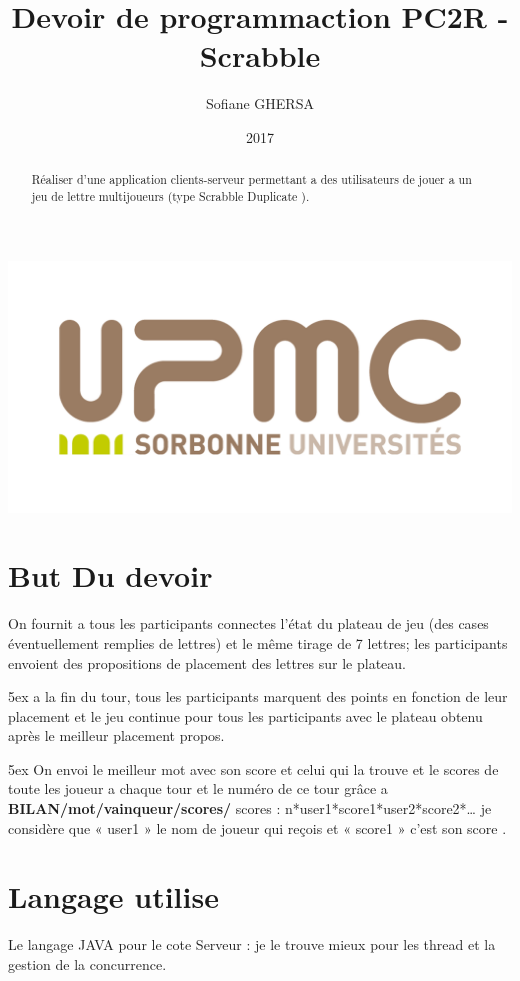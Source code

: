 \documentclass[french]{article}
\title{Devoir de programmaction PC2R - Scrabble}
\author{Sofiane GHERSA}
\date{2017}
\begin{document}
\maketitle
\includegraphics{images/logo_upmc.png}
 
\tableofcontents

\vspace{2cm} %
 
\begin{abstract}
    Réaliser d'une application clients-serveur permettant
a des utilisateurs de jouer a un jeu de lettre multijoueurs (type Scrabble Duplicate ).
\end{abstract}
 
\section{ But Du devoir}
    On fournit a tous les participants connectes l’état du plateau de jeu (des cases
éventuellement remplies de lettres) et le même tirage de 7 lettres; les participants envoient
des propositions de placement des lettres sur le plateau.

\noindent
\setlength { \parindent } {5ex }
    a la fin du tour, tous les participants marquent des points en fonction de leur
placement et le jeu continue pour tous les participants avec le plateau obtenu après le
meilleur placement propos.
 
\noindent
\setlength { \parindent } {5ex }
    On envoi le meilleur mot avec son score et celui qui la trouve et le scores de toute les
joueur a chaque tour et le numéro de ce tour grâce a \textbf{BILAN/mot/vainqueur/scores/}   
\noindent scores : n*user1*score1*user2*score2*…
\noindent je considère que « user1 » le nom de joueur qui reçois et « score1 » c’est son score .

\section{Langage utilise }
    Le langage JAVA pour le cote Serveur : je le trouve mieux pour les thread et la
gestion de la concurrence.
\end{document}
